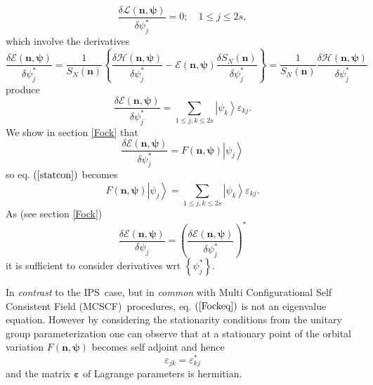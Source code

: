 \documentclass[aps,preprint]{revtex4}%
\begin{document}
\begin{equation}
\frac{\delta\mathcal{L}\left(  \mathbf{n,\psi}\right)  }{\delta\psi_{j}^{\ast
}}=0;\quad1\leq j\leq2s,
\end{equation}
which involve the derivatives
\begin{equation}
\frac{\delta\mathcal{E}\left(  \mathbf{n,\psi}\right)  }{\delta\psi_{j}^{\ast
}}=\frac{1}{S_{N}\left(  \mathbf{n}\right)  }\left\{  \frac{\delta
\mathcal{H}\left(  \mathbf{n,\psi}\right)  }{\delta\psi_{j}^{\ast}%
}-\mathcal{E}\left(  \mathbf{n,\psi}\right)  \frac{\delta S_{N}\left(
\mathbf{n}\right)  }{\delta\psi_{j}^{\ast}}\right\}  =\frac{1}{S_{N}\left(
\mathbf{n}\right)  }\frac{\delta\mathcal{H}\left(  \mathbf{n,\psi}\right)
}{\delta\psi_{j}^{\ast}}%
\end{equation}
produce
\begin{equation}
\frac{\delta\mathcal{E}\left(  \mathbf{n,\psi}\right)  }{\delta\psi_{j}^{\ast
}}=\sum_{1\leq j,k\leq2s}\left\vert \psi_{k}\right\rangle \varepsilon_{kj}.
\label{statcon}%
\end{equation}
We show in section \ref{Fock} that
\begin{equation}
\frac{\delta\mathcal{E}\left(  \mathbf{n,\psi}\right)  }{\delta\psi_{j}^{\ast
}}=F\left(  \mathbf{n,\psi}\right)  \left\vert \psi_{j}\right\rangle
\end{equation}
so eq. $\left(  \ref{statcon}\right)  $ becomes
\begin{equation}
F\left(  \mathbf{n,\psi}\right)  \left\vert \psi_{j}\right\rangle =\sum_{1\leq
j,k\leq2s}\left\vert \psi_{k}\right\rangle \varepsilon_{kj}. \label{Fockeq}%
\end{equation}
As (see section \ref{Fock})%
\begin{equation}
\frac{\delta\mathcal{E}\left(  \mathbf{n,\psi}\right)  }{\delta\psi_{j}%
}=\left(  \frac{\delta\mathcal{E}\left(  \mathbf{n,\psi}\right)  }{\delta
\psi_{j}^{\ast}}\right)  ^{\ast}%
\end{equation}
it is sufficient to consider derivatives wrt $\left\{  \psi_{j}^{\ast
}\right\}  $.

In \emph{contrast} to the IPS\ case, but in \emph{common} with Multi
Configurational Self Consistent Field (MCSCF)\ procedures, eq. $\left(
\ref{Fockeq}\right)  $ is not an eigenvalue equation. However by considering
the stationarity conditions from the unitary group parameterization one can
observe that at a stationary point of the orbital variation $F\left(
\mathbf{n,\psi}\right)  $ becomes self adjoint and hence
\begin{equation}
\varepsilon_{jk}=\varepsilon_{kj}^{\ast}%
\end{equation}
and the matrix $\mathbf{\varepsilon}$ of Lagrange parameters is hermitian.
\end{document}
